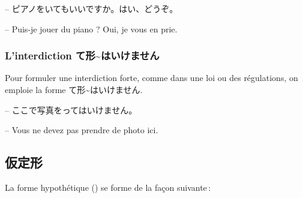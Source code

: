 \begin{tcolorbox}
    -- ピアノをいてもいいですか。はい、どうぞ。

    -- Puis-je jouer du piano ? Oui, je vous en prie.
\end{tcolorbox}

\subsubsection{L'interdiction て形\~{}はいけません}

Pour formuler une interdiction forte, comme dans une loi ou des régulations, on emploie la forme て形\~{}はいけません.

\begin{tcolorbox}
    -- ここで写真をってはいけません。

    -- Vous ne devez pas prendre de photo ici.
\end{tcolorbox}

\subsection{仮定形}

La forme hypothétique () se forme de la façon suivante :

